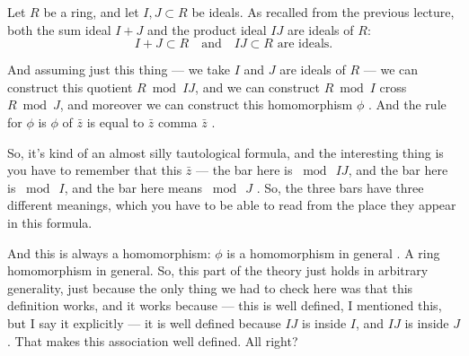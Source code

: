 \begin{content}
Let $R$ be a ring, and let $I, J \subset R$ be ideals. As recalled from the previous lecture, both the sum ideal $I + J$ and the product ideal $IJ$ are ideals of $R$:
\[
I + J \subset R \quad \text{and} \quad IJ \subset R \text{ are ideals.}
\]
\end{content}

\begin{speech}[00:01:01 - 00:02:29]
And assuming just this thing --- we take $I$ and $J$ are ideals of $R$ --- we can construct this quotient $R \bmod IJ$, and we can construct $R \bmod I$ cross $R \bmod J$, and moreover we can construct this homomorphism $\phi$ . And the rule for $\phi$ is $\phi$ of $\bar{z}$ is equal to $\bar{z}$ comma $\bar{z}$ .

So, it's kind of an almost silly tautological formula, and the interesting thing is you have to remember that this $\bar{z}$  --- the bar here is $\bmod\ IJ$, and the bar here is $\bmod\ I$, and the bar here means $\bmod\ J$ . So, the three bars have three different meanings, which you have to be able to read from the place they appear in this formula.

And this is always a homomorphism: $\phi$ is a homomorphism in general . A ring homomorphism in general. So, this part of the theory just holds in arbitrary generality, just because the only thing we had to check here was that this definition works, and it works because --- this is well defined, I mentioned this, but I say it explicitly --- it is well defined because $IJ$ is inside $I$, and $IJ$ is inside $J$ . That makes this association well defined. All right?
\end{speech}

